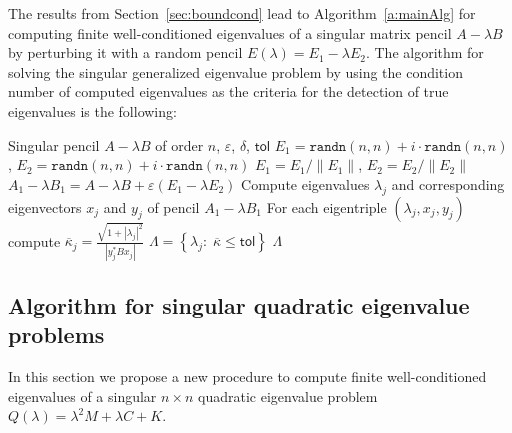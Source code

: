 \documentclass[12pt]{article}
\begin{document}
The results from Section~\ref{sec:boundcond} lead to Algorithm~\ref{a:mainAlg} for computing finite well-conditioned eigenvalues of a singular matrix pencil $A-\lambda B$ by perturbing it with a random pencil $E(\lambda) = E_1-\lambda E_2$. 
The algorithm for solving the singular generalized eigenvalue problem by using the condition number of computed eigenvalues as the criteria for the detection of true eigenvalues is the following:
\begin{algorithm}[H]
\caption{Algorithm for solving singular generalized eigenvalue problem}
\begin{algorithmic}[1]
\label{a:mainAlg}
\REQUIRE Singular pencil $A-\lambda B$ of order $n$, $\varepsilon$, $\delta$, $\mathsf{tol}$
\STATE $E_{1} = \texttt{randn}(n,n)+i\cdot\texttt{randn}(n,n)$, $E_{2} = \texttt{randn}(n,n)+i\cdot\texttt{randn}(n,n)$
\STATE $E_1 = E_1/\|E_1\|$, $E_2 = E_2/\|E_2\|$
\STATE $A_1-\lambda B_1 = A-\lambda B + \varepsilon(E_{1}-\lambda E_{2})$
\STATE Compute eigenvalues $\lambda_{j}$ and corresponding eigenvectors $x_{j}$ and $y_{j}$ of pencil $A_1-\lambda B_1$
\STATE For each eigentriple $(\lambda_{j},x_{j},y_{j})$ compute $\overline{\kappa}_j=\frac{\sqrt{1+|\lambda_j|^2}}{|y_j^*Bx_j|}$
\STATE $\Lambda = \left\{ \lambda_{j}: \; \overline{\kappa}\leq \mathsf{tol} \right\}$
\RETURN $\Lambda$
\end{algorithmic}
\end{algorithm}

\subsection{Algorithm for singular quadratic eigenvalue problems}

In this section we propose a new procedure to compute finite well-conditioned eigenvalues of a singular $n\times n$ quadratic eigenvalue problem $Q(\lambda) = \lambda^2M+\lambda C +K$.
\end{document}
